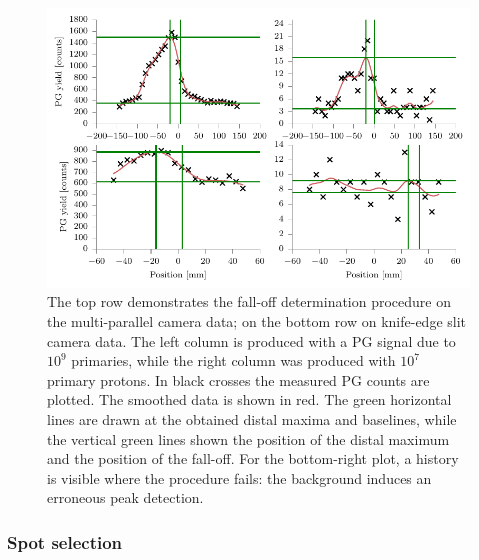 \documentclass[a4paper,english]{article}
\begin{document}
\begin{figure}[htp]
  \centering
  \includegraphics[width=0.99\linewidth]{fopproc}
  \caption{The top row demonstrates the fall-off determination procedure on the multi-parallel camera data; on the bottom row on knife-edge slit camera data. The left column is produced with a PG signal due to $10^9$ primaries, while the right column was produced with $10^7$ primary protons. In black crosses the measured PG counts are plotted. The smoothed data is shown in red. The green horizontal lines are drawn at the obtained distal maxima and baselines, while the vertical green lines shown the position of the distal maximum and the position of the fall-off. For the bottom-right plot, a history is visible where the procedure fails: the background induces an erroneous peak detection.}
  \label{fig:our-fit}
\end{figure}

\subsubsection{Spot selection}
\end{document}

